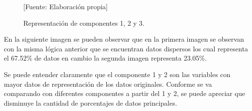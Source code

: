 \begin{figure}[H]
 \centering
  \caption{Representación de componentes 1, 2 y 3. }
   

 \begin{center}
    [Fuente:  Elaboración propia]
\end{center}
\end{figure}


En la siguiente imagen se pueden observar que en la primera imagen se observan con la misma lógica anterior que se encuentran datos dispersos los cual representa el 67.52\% de datos en cambio la segunda imagen representa 23.05\%. 

Se puede entender claramente  que el componente 1 y 2 son las variables con mayor datos de representación de los datos originales. Conforme se va comparando con diferentes componentes a partir del 1 y 2, se puede apreciar que disminuye la cantidad de porcentajes de datos principales. 

